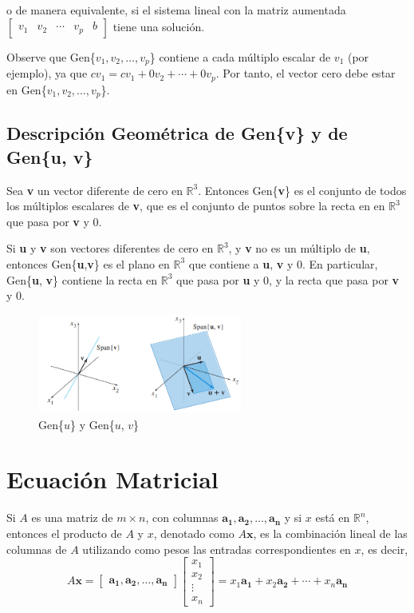\documentclass{article}
\begin{document}
o de manera equivalente, si el sistema lineal con la matriz aumentada $\begin{bmatrix} v_1 & v_2 & \dotsb & v_p & b \end{bmatrix}$ tiene una solución.

Observe que Gen\{$v_1,v_2,\dots, v_p$\} contiene a cada múltiplo escalar de $v_1$ (por ejemplo), ya que $cv_1 = cv_1 + 0v_2 + \dotsb + 0v_p$. Por tanto, el vector cero debe estar en Gen\{$v_1,v_2,\dots, v_p$\}.

\subsection{Descripción Geométrica de Gen\{v\} y de Gen\{u, v\}}

Sea \textbf{v} un vector diferente de cero en $\mathbb{R}^3$. Entonces Gen\{\textbf{v}\} es el conjunto de todos los múltiplos escalares de \textbf{v}, que es el conjunto de puntos sobre la recta en en $\mathbb{R}^3$ que pasa por \textbf{v} y 0. 

Si \textbf{u} y \textbf{v} son vectores diferentes de cero en $\mathbb{R}^3$, y \textbf{v} no es un múltiplo de \textbf{u}, entonces Gen\{\textbf{u},\textbf{v}\} es el plano en $\mathbb{R}^3$ que contiene a \textbf{u}, \textbf{v} y 0. En particular, Gen\{\textbf{u}, \textbf{v}\} contiene la recta en $\mathbb{R}^3$ que pasa por \textbf{u} y 0, y la recta que pasa por \textbf{v} y 0.

\begin{figure}[ht]
    \centerline{\includegraphics[width=0.6\textwidth]{image11.png}}
    \caption{Gen\{\textbf{$u$}\} y Gen\{\textbf{$u$}, \textbf{$v$}\}}
    \label{}
\end{figure}

\section{Ecuación Matricial}

Si $A$ es una matriz de $m \times n$, con columnas $\mathbf{a_1},\mathbf{a_2},\dots, \mathbf{a_n}$ y si $x$ está en $\mathbb{R}^n$, entonces el producto de $A$ y $x$, denotado como $A\mathbf{x}$, es la combinación lineal de las columnas de $A$ utilizando como pesos las entradas correspondientes en $x$, es decir, $$A\mathbf{x} = \begin{bmatrix}
    \mathbf{a_1},\mathbf{a_2},\dots, \mathbf{a_n} \end{bmatrix} \begin{bmatrix}x_1\\ x_2\\ \vdots \\x_n \end{bmatrix} = x_1\mathbf{a_1} + x_2\mathbf{a_2} + \dotsb + x_n\mathbf{a_n}$$
\end{document}
